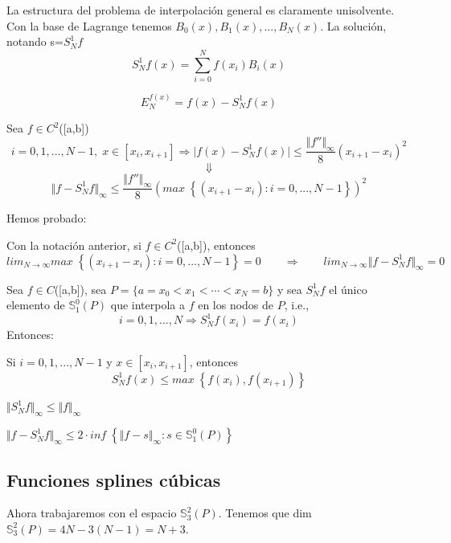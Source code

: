 La estructura del problema de interpolación general es claramente unisolvente. Con la base de Lagrange tenemos {$B_0(x), B_1(x),...,B_N(x)$}. La solución, notando s=$S_N^1f$
\[ S_N^1f(x) = \sum_{i=0}^N f(x_i)B_i(x) \]

\begin{ndef}
\[ E_N^{f(x)} = f(x) - S_N^1f(x) \]
\end{ndef}

Sea $f \in C^2$([a,b])
\[ i=0,1,...,N-1, \; x \in \left[ x_i,x_{i+1} \right] \Rightarrow \vert f(x) - S_N^1f(x) \vert \leq \frac{\Vert f'' \Vert _\infty}{8}(x_{i+1}-x_i)^2 \]
\[ \Downarrow \]
\[ \Vert f-S_N^1f \Vert _\infty \leq \frac{\Vert f'' \Vert _\infty}{8} \left( max \; \left\lbrace (x_{i+1}-x_i):i=0,...,N-1 \right\rbrace \right) ^2 \]

Hemos probado:

\begin{nprop}
Con la notación anterior, si $f \in C^2$([a,b]), entonces
\[ lim_{N\rightarrow \infty} max \; \left\lbrace (x_{i+1}-x_i):i=0,...,N-1 \right\rbrace = 0 \qquad \Rightarrow \qquad lim_{N \rightarrow \infty} \Vert f - S_N^1f \Vert _\infty = 0 \]
\end{nprop}

\begin{nprop}
Sea $f \in C$([a,b]), sea $P = \lbrace a=x_0 < x_1 < \cdots < x_N = b\rbrace$ y sea $S_N^1f$ el único elemento de $\mathbb{S}_1^0(P)$ que interpola a $f$ en los nodos de $P$, i.e.,
\[ i=0,1,...,N \Rightarrow S_N^1f(x_i)=f(x_i) \]
Entonces:
	\begin{nlist}
	\item Si $i=0,1,...,N-1$ y $x \in \left[ x_i,x_{i+1} \right]$, entonces
	\[ S_N^1f(x) \leq max \; \left\lbrace f(x_i),f(x_{i+1}) \right\rbrace \]
	\item $\Vert S_N^1f \Vert _\infty \leq \Vert f \Vert _\infty $
	\item $\Vert f - S_N^1f \Vert _\infty \leq 2 \cdot inf \; \left\lbrace \Vert f-s \Vert _\infty : s \in \mathbb{S}_1^0(P) \right\rbrace$
	\end{nlist}
\end{nprop}

\subsection{Funciones splines cúbicas}
Ahora trabajaremos con el espacio $\mathbb{S}_3^2(P)$. Tenemos que dim$\mathbb{S}_3^2(P) = 4N-3(N-1) = N+3$.

